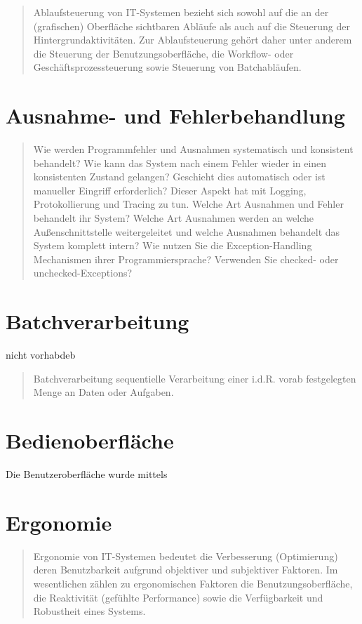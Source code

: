 \begin{quote}
	Ablaufsteuerung von IT-Systemen bezieht sich sowohl auf die an der (grafischen) Oberfläche sichtbaren Abläufe als auch auf die Steuerung der Hintergrundaktivitäten. Zur Ablaufsteuerung gehört daher unter anderem die Steuerung der Benutzungsoberfläche, die Workflow- oder Geschäftsprozessteuerung sowie Steuerung von Batchabläufen.
\end{quote}

\section{Ausnahme- und Fehlerbehandlung}

\begin{quote}
	Wie werden Programmfehler und Ausnahmen systematisch und konsistent behandelt?
	Wie kann das System nach einem Fehler wieder in einen konsistenten Zustand gelangen? Geschieht dies automatisch oder ist manueller Eingriff erforderlich? Dieser Aspekt hat mit Logging, Protokollierung und Tracing zu tun.
	Welche Art Ausnahmen und Fehler behandelt ihr System? Welche Art Ausnahmen werden an welche Außenschnittstelle weitergeleitet und welche Ausnahmen behandelt das System komplett intern? Wie nutzen Sie die Exception-Handling Mechanismen ihrer Programmiersprache? Verwenden Sie checked- oder unchecked-Exceptions?
\end{quote}

\section{Batchverarbeitung}

nicht vorhabdeb

\begin{quote}
	Batchverarbeitung sequentielle Verarbeitung einer i.d.R. vorab festgelegten Menge an Daten oder Aufgaben.
\end{quote}

\section{Bedienoberfläche}

Die Benutzeroberfläche wurde mittels 

\section{Ergonomie}

\begin{quote}
	Ergonomie von IT-Systemen bedeutet die Verbesserung (Optimierung) deren Benutzbarkeit aufgrund objektiver und subjektiver Faktoren. Im wesentlichen zählen zu ergonomischen Faktoren die Benutzungsoberfläche, die Reaktivität (gefühlte Performance) sowie die Verfügbarkeit und Robustheit eines Systems.
\end{quote}

